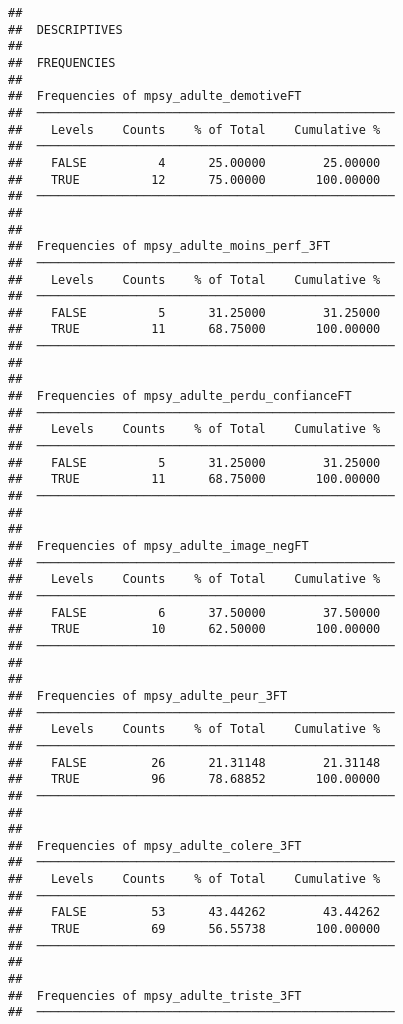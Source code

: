 \documentclass[
]{article}
\begin{document}
\begin{verbatim}
## 
##  DESCRIPTIVES
## 
##  FREQUENCIES
## 
##  Frequencies of mpsy_adulte_demotiveFT              
##  ────────────────────────────────────────────────── 
##    Levels    Counts    % of Total    Cumulative %   
##  ────────────────────────────────────────────────── 
##    FALSE          4      25.00000        25.00000   
##    TRUE          12      75.00000       100.00000   
##  ────────────────────────────────────────────────── 
## 
## 
##  Frequencies of mpsy_adulte_moins_perf_3FT          
##  ────────────────────────────────────────────────── 
##    Levels    Counts    % of Total    Cumulative %   
##  ────────────────────────────────────────────────── 
##    FALSE          5      31.25000        31.25000   
##    TRUE          11      68.75000       100.00000   
##  ────────────────────────────────────────────────── 
## 
## 
##  Frequencies of mpsy_adulte_perdu_confianceFT       
##  ────────────────────────────────────────────────── 
##    Levels    Counts    % of Total    Cumulative %   
##  ────────────────────────────────────────────────── 
##    FALSE          5      31.25000        31.25000   
##    TRUE          11      68.75000       100.00000   
##  ────────────────────────────────────────────────── 
## 
## 
##  Frequencies of mpsy_adulte_image_negFT             
##  ────────────────────────────────────────────────── 
##    Levels    Counts    % of Total    Cumulative %   
##  ────────────────────────────────────────────────── 
##    FALSE          6      37.50000        37.50000   
##    TRUE          10      62.50000       100.00000   
##  ────────────────────────────────────────────────── 
## 
## 
##  Frequencies of mpsy_adulte_peur_3FT                
##  ────────────────────────────────────────────────── 
##    Levels    Counts    % of Total    Cumulative %   
##  ────────────────────────────────────────────────── 
##    FALSE         26      21.31148        21.31148   
##    TRUE          96      78.68852       100.00000   
##  ────────────────────────────────────────────────── 
## 
## 
##  Frequencies of mpsy_adulte_colere_3FT              
##  ────────────────────────────────────────────────── 
##    Levels    Counts    % of Total    Cumulative %   
##  ────────────────────────────────────────────────── 
##    FALSE         53      43.44262        43.44262   
##    TRUE          69      56.55738       100.00000   
##  ────────────────────────────────────────────────── 
## 
## 
##  Frequencies of mpsy_adulte_triste_3FT              
##  ────────────────────────────────────────────────── 

\end{verbatim}
\end{document}
